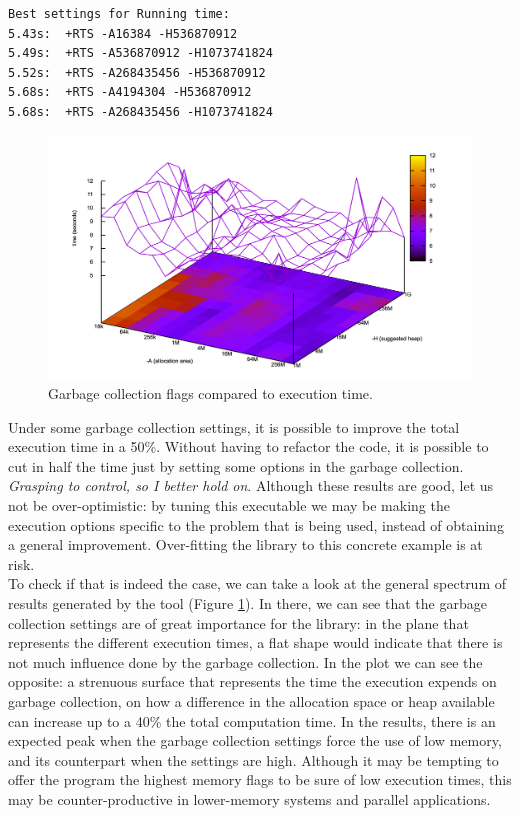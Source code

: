 \begin{lstlisting}
Best settings for Running time:
5.43s:  +RTS -A16384 -H536870912
5.49s:  +RTS -A536870912 -H1073741824
5.52s:  +RTS -A268435456 -H536870912
5.68s:  +RTS -A4194304 -H536870912
5.68s:  +RTS -A268435456 -H1073741824
\end{lstlisting}

\begin{figure}[ht]
\centering
\includegraphics[width=\textwidth]{img/gc-tuning.png}
\caption{Garbage collection flags compared to execution time.}
\label{gc-tuning}
\end{figure}

Under some garbage collection settings, it is possible to improve the total
execution time in a 50\%. Without having to refactor the code, it is possible
to cut in half the time just by setting some options in the garbage collection.
\emph{Grasping to control, so I better hold on}. Although these results are
good, let us not be over-optimistic: by tuning this executable we may be making
the execution options specific to the problem that is being used, instead of
obtaining a general improvement. Over-fitting the
library to this concrete example is at risk.\\

To check if that is indeed the case, we can take a look at the general spectrum
of results generated by the tool (Figure \ref{gc-tuning}). In there, we can see
that the garbage collection settings are of great importance for the library:
in the plane that represents the different execution times, a flat shape would
indicate that there is not much influence done by the garbage collection. In
the plot we can see the opposite: a strenuous surface that represents the time
the execution expends on garbage collection, on how a difference in the
allocation space or heap available can increase up to a 40\% the total
computation time. In the results, there is an expected peak when the garbage
collection settings force the use of low memory, and its counterpart when the
settings are high. Although it may be tempting to offer the program the highest
memory flags to be sure of low execution times, this may be counter-productive
in lower-memory systems and parallel applications.\\


